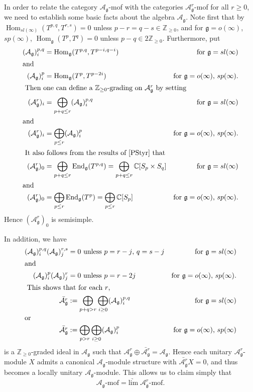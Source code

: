 \documentclass{amsart}
\renewcommand{\sl}{sl}
\newcommand{\so}{o}
\renewcommand{\sp}{sp}
\renewcommand{\gg}{\mathfrak{g}}
\newcommand{\ZZ}{\mathbb{Z}}
\newcommand{\limarr}{\underrightarrow{\mathrm{lim}} \;}
\theoremstyle{definition}
\numberwithin{equation}{section}
\begin{document}
In order to relate the category $\mathcal{A}_\gg$-mof with the categories $\mathcal{A}_\gg^r$-mof for all $r \geq 0$, we need to establish some basic facts about the algebra $\mathcal{A}_\gg$.  Note first that by \cite{PStyr} 
$\operatorname{Hom}_{\sl(\infty)}(T^{p,q},T^{r,s})=0$ unless
$p-r=q-s\in \mathbb Z_{\geq 0}$, and for $\gg = \so(\infty)$, $\sp(\infty)$, $\operatorname{Hom}_\gg(T^{p},T^{q})=0$ unless
$p-q\in 2\mathbb Z_{\geq 0}$.
Furthermore, put 
\begin{align*}
(\mathcal A_\gg)^{p,q}_i&=\operatorname{Hom}_\gg(T^{p,q}, T^{p-i,q-i})
&\textrm{for } \gg=\sl(\infty) \\
\intertext{and}
(\mathcal A_\gg)_i^p&=\operatorname{Hom}_\gg(T^p,T^{p-2i})
&\textrm{for }\gg=\so(\infty) \textrm{, } \sp(\infty).\\ 
\intertext{
Then one can define a $\mathbb Z_{\geq 0}$-grading on $\mathcal A^r_\gg$ by
setting}
(\mathcal A^r_\gg)_i &=\bigoplus_{p+q\leq r} (\mathcal A_\gg)^{p,q}_i &\textrm{for } \gg=\sl(\infty) \\
\intertext{and}
(\mathcal A^r_\gg)_i &=\bigoplus_{p\leq r}  (\mathcal A_\gg)_i^p
&\textrm{for }\gg=\so(\infty) \textrm{, } \sp(\infty).\\ 
\intertext{
It also follows from the results of  \cite{PStyr} that} 
(\mathcal A^r_\gg)_0 & =\bigoplus_{p+q\leq r} \operatorname{End}_\gg(T^{p,q})=\bigoplus_{p+q\leq r}\mathbb C[S_p\times S_q] &\textrm{for } \gg=\sl(\infty) \\
\intertext{and}
(\mathcal A^r_\gg)_0 & =\bigoplus_{p\leq r} \operatorname{End}_\gg(T^{p})=\bigoplus_{p\leq r} \mathbb C[S_p] &\textrm{for }\gg=\so(\infty) \textrm{, } \sp(\infty).
\end{align*}
Hence $(\mathcal A^r_\gg)_0$ is semisimple.

In addition, we have
\begin{align*}
(\mathcal A_\gg)^{p,q}_i (\mathcal A_\gg)^{r,s}_j &=0 \textrm{ unless }p =r -j \textrm{, }q =s-j  &\textrm{for } \gg=\sl(\infty) \\
\intertext{and}
(\mathcal A_\gg)^p_i (\mathcal A_\gg)^r_j &=0 \textrm{ unless }p =r -2j  
&\textrm{for }\gg=\so(\infty) \textrm{, } \sp(\infty).\\ 
\intertext{
This shows that for each $r$,} 
\bar{\mathcal A^r_\gg} &:=\bigoplus_{p+q > r} \bigoplus_{i \geq 0}  (\mathcal A_\gg)_i^{p,q}
&\textrm{for } \gg=\sl(\infty) \\
\intertext{or}
\bar{\mathcal A^r_\gg} &:=\bigoplus_{p > r} \bigoplus_{i \geq 0}  (\mathcal A_\gg)_i^p
&\textrm{for }\gg=\so(\infty) \textrm{, } \sp(\infty)
\end{align*}
is a $\ZZ_{\geq 0}$-graded ideal in $\mathcal A_\gg$ such that $\mathcal A^r_\gg \oplus \bar{\mathcal A^r_\gg} = \mathcal A_\gg$.
Hence each unitary $\mathcal A^r_\gg$-module $X$ admits a canonical $\mathcal A_\gg$-module structure with $\bar{\mathcal A^r_\gg} X = 0$, and thus becomes a locally unitary $\mathcal A_\gg$-module.  This allows us to claim simply that  
$$\mathcal{A}_\gg\textrm{-mof}=\limarr  \mathcal{A}_\gg^r \textrm{-mof}.$$
\end{document}
